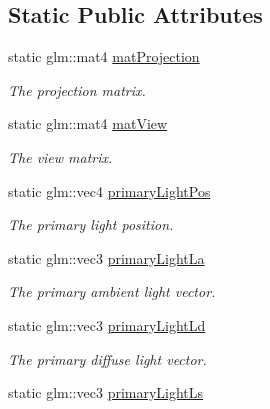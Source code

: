\subsection*{Static Public Attributes}
\begin{DoxyCompactItemize}
\item 
static glm\+::mat4 \hyperlink{class_obj_a0d33aa0d20b93246b216c819e5b6bc11}{mat\+Projection}\hypertarget{class_obj_a0d33aa0d20b93246b216c819e5b6bc11}{}\label{class_obj_a0d33aa0d20b93246b216c819e5b6bc11}

\begin{DoxyCompactList}\small\item\em The projection matrix. \end{DoxyCompactList}\item 
static glm\+::mat4 \hyperlink{class_obj_a751d111d1f33000d06431a65527c99f0}{mat\+View}\hypertarget{class_obj_a751d111d1f33000d06431a65527c99f0}{}\label{class_obj_a751d111d1f33000d06431a65527c99f0}

\begin{DoxyCompactList}\small\item\em The view matrix. \end{DoxyCompactList}\item 
static glm\+::vec4 \hyperlink{class_obj_ad4050341a504f2d9102445c4a0d92a3f}{primary\+Light\+Pos}\hypertarget{class_obj_ad4050341a504f2d9102445c4a0d92a3f}{}\label{class_obj_ad4050341a504f2d9102445c4a0d92a3f}

\begin{DoxyCompactList}\small\item\em The primary light position. \end{DoxyCompactList}\item 
static glm\+::vec3 \hyperlink{class_obj_a38ac917bd30e136a2841a2800e8f3036}{primary\+Light\+La}\hypertarget{class_obj_a38ac917bd30e136a2841a2800e8f3036}{}\label{class_obj_a38ac917bd30e136a2841a2800e8f3036}

\begin{DoxyCompactList}\small\item\em The primary ambient light vector. \end{DoxyCompactList}\item 
static glm\+::vec3 \hyperlink{class_obj_af69c1fd6d6bd9b7229fcf42c54375d1c}{primary\+Light\+Ld}\hypertarget{class_obj_af69c1fd6d6bd9b7229fcf42c54375d1c}{}\label{class_obj_af69c1fd6d6bd9b7229fcf42c54375d1c}

\begin{DoxyCompactList}\small\item\em The primary diffuse light vector. \end{DoxyCompactList}\item 
static glm\+::vec3 \hyperlink{class_obj_ae3253599256afffada1325a44da148a0}{primary\+Light\+Ls}\hypertarget{class_obj_ae3253599256afffada1325a44da148a0}{}\label{class_obj_ae3253599256afffada1325a44da148a0}


\end{DoxyCompactItemize}
